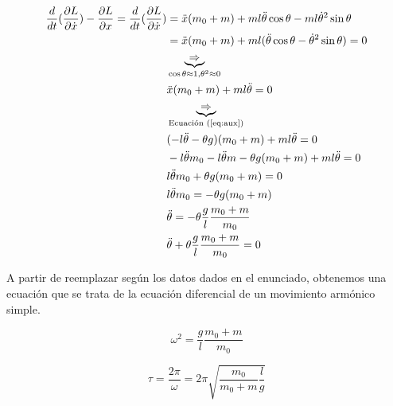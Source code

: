 \documentclass[11pt]{article}
\begin{document}
\begin{align*}
  \frac{d}{dt} (\frac{\partial L}{\partial \dot{x}}) - \frac{\partial L}{\partial x}
  =\frac{d}{dt} (\frac{\partial L}{\partial \dot{x}}) &= 
    \ddot{x}(m_0 + m) + ml\ddot{\theta} \cos \theta - ml \dot{\theta}^2 \sin \theta \\
    &= \ddot{x}(m_0 + m) + ml (\ddot{\theta} \cos \theta - \dot{\theta}^2 \sin \theta) = 0 \\
    &\underbrace{\Rightarrow}_{\cos \theta \approx 1, \theta^2 \approx 0} \\
    &\ddot{x}(m_0 + m) + ml\ddot{\theta} = 0  \\
    &\underbrace{\Rightarrow}_{\text{Ecuación (\ref{eq:aux})}} \\
    &(-l\ddot{\theta} - \theta g)(m_0 + m) +ml\ddot{\theta} = 0 \\
    &-l\ddot{\theta}m_0 - l\ddot{\theta}m - \theta g (m_0 + m) + ml\ddot{\theta} = 0 \\
    &l\ddot{\theta}m_0 + \theta g (m_0 + m) = 0 \\
    &l\ddot{\theta}m_0 = -\theta g (m_0 + m) \\
    &\ddot{\theta} = - \theta \frac{g}{l} \frac{m_0 + m}{m_0} \\
    &\ddot{\theta} + \theta \frac{g}{l} \frac{m_0 + m}{m_0} = 0
\end{align*}

A partir de reemplazar según los datos dados en el enunciado, obtenemos
una ecuación que se trata de la ecuación diferencial de un
movimiento armónico simple.

\begin{equation*}
  \omega^2 = \frac{g}{l} \frac{m_0 + m}{m_0}
\end{equation*}

\begin{equation*}
  \tau = \frac{2\pi}{\omega} = 2\pi \sqrt{\frac{m_0}{m_0 + m} \frac{l}{g}}
\end{equation*}
\end{document}
